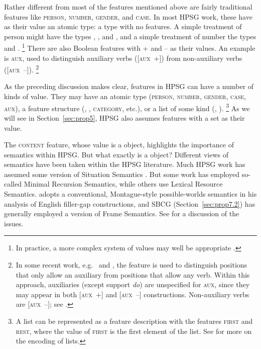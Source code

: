 \documentclass[output=paper
	        ,collection
	        ,collectionchapter
 	        ,biblatex
                ,babelshorthands
                ,newtxmath
                ,draftmode
                ,colorlinks, citecolor=brown
]{langscibook}
\begin{document}
Rather different from most of the features mentioned above are fairly traditional features like \textsc{person, number, gender}, and \textsc{case}. In most HPSG work, these have as their value an atomic type: a type with no features. A simple treatment of person might have the types , , and , and a simple treatment of number the types  and .%
%
\footnote{In practice, a more complex system of values may well be appropriate \citep[Section~3]{Flickinger2000a}.}
%
There are also Boolean features with + and – as their values. An example is \textsc{aux}, used to distinguish auxiliary verbs ([\textsc{aux}~+]) from non-auxiliary verbs ([\textsc{aux}~–]).%
%
\footnote{In some recent work, e.g.\ \citet[157--162]{Sag2012a} and \citet{Sag2020a}, the feature is used to distinguish positions that only allow an auxiliary from positions that allow any verb. Within this approach, auxiliaries (except support \emph{do}) are unspecified for \textsc{aux}, since they may appear in both [\textsc{aux}~$+$] and [\textsc{aux}~$–$] constructions. Non-auxiliary verbs are [\textsc{aux}~$–$]; see .}
%

As the preceding discussion makes clear, features in HPSG can have a number of kinds of value. They may have an atomic type (\textsc{person}, \textsc{number}, \textsc{gender}, \textsc{case}, \textsc{aux}), a feature structure (\synsem, \local, \textsc{category}, etc.), or a list of some kind (\subj, \comps).%
%
\footnote{A list can be represented as a feature description with the features \textsc{first} and \textsc{rest}, where the value of \textsc{first} is the first element of the list. See \crossrefchapterw[\page \pageref{page-list-encoding}]{formal-background} for more on the encoding of lists.}
%
As we will see in Section~\ref{sec:prop5}, HPSG also assumes features with a set as their value.

The \textsc{content} feature, whose value is a  object, highlights the importance of
semantics within HPSG. But what exactly is a  object? Different views of semantics
have been taken within the HPSG literature. Much HPSG work has assumed some version of Situation
Semantics \citep{BP83a}. But some work has employed so-called Minimal
Recursion Semantics\indexmrs \citep{CFPS2005a}, while others use Lexical Resource
Semantics\indexlrs \citep{RS2004a-u}. \citet[501]{Sag2010b} adopts a
conventional, Montague-style possible-worlds semantics \citep{Montague74a-ed} in his analysis of English filler-gap constructions, and SBCG (Section~\ref{sec:prop7.2}) has generally employed a version of Frame Semantics. See  for a discussion of the issues.
\end{document}
